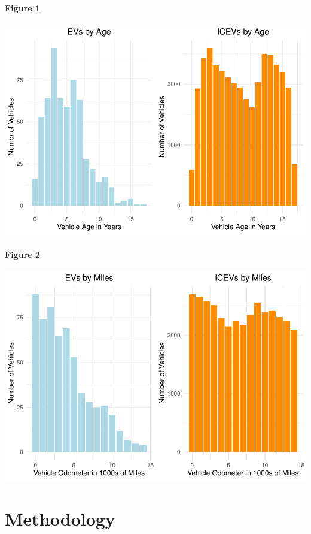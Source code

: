 \documentclass{article}
\begin{document}
\hypertarget{figure-1}{%
\paragraph{Figure 1}\label{figure-1}}

\includegraphics{EV_Project_files/figure-latex/unnamed-chunk-5-1.pdf}

\hypertarget{figure-2}{%
\paragraph{Figure 2}\label{figure-2}}

\includegraphics{EV_Project_files/figure-latex/unnamed-chunk-6-1.pdf}

\hypertarget{methodology}{%
\section{Methodology}\label{methodology}}
\end{document}
